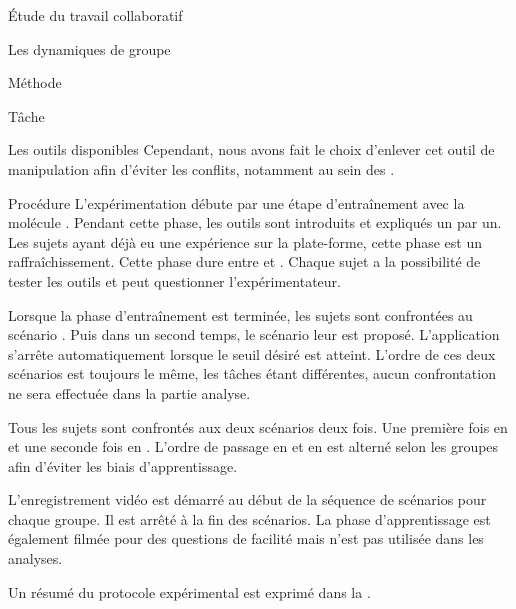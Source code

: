 \documentclass[myfrancais]{mythesis}
\begin{document}
\begin{mypart}{Étude du travail collaboratif}
\begin{mychapter}{Les dynamiques de groupe}
\begin{mysection}{Méthode}
\begin{mysubsection}{Tâche}
\begin{mysubsubsection}{Les outils disponibles}
						Cependant, nous avons fait le choix d'enlever cet outil de manipulation afin d'éviter les conflits, notamment au sein des .
					\end{mysubsubsection}
				\end{mysubsection}
				\begin{mysubsection}{Procédure}
					L'expérimentation débute par une étape d'entraînement avec la molécule \myTRPCAGE.
					Pendant cette phase, les outils sont introduits et expliqués un par un.
					Les sujets ayant déjà eu une expérience sur la plate-forme, cette phase est un raffraîchissement.
					Cette phase dure entre  et .
					Chaque sujet a la possibilité de tester les outils et peut questionner l'expérimentateur.

					Lorsque la phase d'entraînement est terminée, les sujets sont confrontées au scénario .
					Puis dans un second temps, le scénario  leur est proposé.
					L'application s'arrête automatiquement lorsque le seuil  désiré est atteint.
					L'ordre de ces deux scénarios est toujours le même, les tâches étant différentes, aucun confrontation ne sera effectuée dans la partie analyse.

					Tous les sujets sont confrontés aux deux scénarios deux fois.
					Une première fois en  et une seconde fois en .
					L'ordre de passage en  et en  est alterné selon les groupes afin d'éviter les biais d'apprentissage.

					L'enregistrement vidéo est démarré au début de la séquence de scénarios pour chaque groupe.
					Il est arrêté à la fin des scénarios.
					La phase d'apprentissage est également filmée pour des questions de facilité mais n'est pas utilisée dans les analyses.

					Un résumé du protocole expérimental est exprimé dans la .


\end{mysubsection}
\end{mysection}
\end{mychapter}
\end{mypart}
\end{document}

